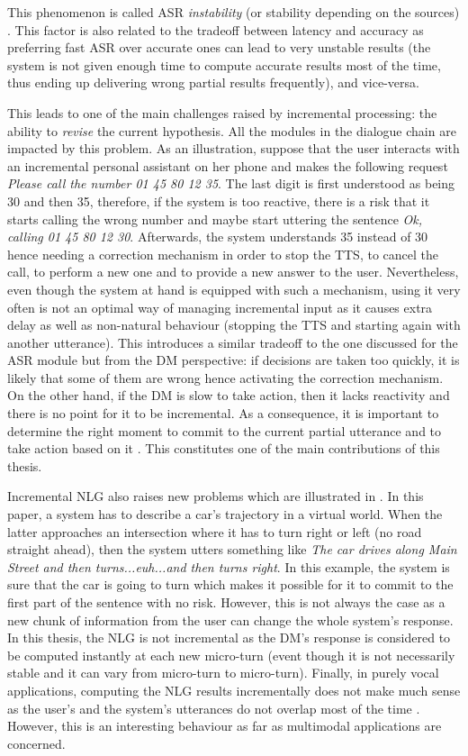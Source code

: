 		This phenomenon is called ASR \textit{instability} (or stability depending on the sources) \cite{Selfridge2011}. This factor is also related to the tradeoff between latency and accuracy as preferring fast ASR over accurate ones can lead to very unstable results (the system is not given enough time to compute accurate results most of the time, thus ending up delivering wrong partial results frequently), and vice-versa.
		
This leads to one of the main challenges raised by incremental processing: the ability to \textit{revise} the current hypothesis. All the modules in the dialogue chain are impacted by this problem. As an illustration, suppose that the user interacts with an incremental personal assistant on her phone and makes the following request \textit{Please call the number 01 45 80 12 35}. The last digit is first understood as being 30 and then 35, therefore, if the system is too reactive, there is a risk that it starts calling the wrong number and maybe start uttering the sentence \textit{Ok, calling 01 45 80 12 30}. Afterwards, the system understands 35 instead of 30 hence needing a correction mechanism in order to stop the TTS, to cancel the call, to perform a new one and to provide a new answer to the user. Nevertheless, even though the system at hand is equipped with such a mechanism, using it very often is not an optimal way of managing incremental input as it causes extra delay as well as non-natural behaviour (stopping the TTS and starting again with another utterance). This introduces a similar tradeoff to the one discussed for the ASR module but from the DM perspective: if decisions are taken too quickly, it is likely that some of them are wrong hence activating the correction mechanism. On the other hand, if the DM is slow to take action, then it lacks reactivity and there is no point for it to be incremental. As a consequence, it is important to determine the right moment to commit to the current partial utterance and to take action based on it \cite{Raux2008,Lu2011}. This constitutes one of the main contributions of this thesis.

		Incremental NLG also raises new problems which are illustrated in \cite{Baumann2013}. In this paper, a system has to describe a car's trajectory in a virtual world. When the latter approaches an intersection where it has to turn right or left (no road straight ahead), then the system utters something like \textit{The car drives along Main Street and then turns...euh...and then turns right}. In this example, the system is sure that the car is going to turn which makes it possible for it to commit to the first part of the sentence with no risk. However, this is not always the case as a new chunk of information from the user can change the whole system's response. In this thesis, the NLG is not incremental as the DM's response is considered to be computed instantly at each new micro-turn (event though it is not necessarily stable and it can vary from micro-turn to micro-turn). Finally, in purely vocal applications, computing the NLG results incrementally does not make much sense as the user's and the system's utterances do not overlap most of the time \cite{Sacks1974}. However, this is an interesting behaviour as far as multimodal applications are concerned.

